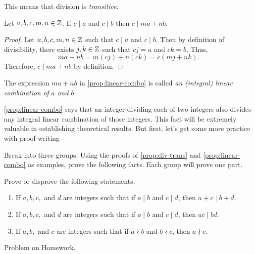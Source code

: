 \documentclass{ximera}
\begin{document}
This means that division is \emph{transitive}. 


\begin{proposition}\label{prop:linear-combo}
  Let $a,b,c,m,n\in\mathbb Z$.
  If $c\mid a$ and $c\mid b$ then $c\mid ma+nb$.

  \begin{proof}
    Let $a,b,c,m,n\in\mathbb Z$ such that $c\mid a$ and $c\mid b$. Then by definition of divisibility, there exists $j,k\in\mathbb Z$ such that $cj=a$ and $ck=b$. Thus, \[ma+nb=m(cj)+n(ck)=c(mj+nk).\] Therefore, $c\mid ma+nb$ by definition.
  \end{proof}
\end{proposition}

\begin{defn}
The expression $ma+nb$ in \cref{prop:linear-combo} is called \emph{an (integral) linear combination of $a$ and $b$.}
\end{defn}
\cref{prop:linear-combo} says that an integer dividing each of two integers also divides any integral linear combination of those integers. This fact will be extremely valuable in establishing theoretical results. But first, let's get some more practice with proof writing

Break into three groups. Using the proofs of \cref{prop:div-trans} and \cref{prop:linear-combo} as examples, prove the following facts. Each group will prove one part.

\begin{br}\label{divisfacts}
  Prove or disprove the following statements.
  \begin{enumerate}
    \item If $a,b,c,$ and $d$ are integers such that if $a\mid b$ and $c\mid d$, then $a+c\mid b+d$.
    \item If $a,b,c,$ and $d$ are integers such that if $a\mid b$ and $c\mid d$, then $ac\mid bd$.
    \item If $a,b,$ and $c$ are integers such that if $a\nmid b$ and $b\nmid c$, then $a\nmid c$.
  \end{enumerate}
  
  \begin{solution}
    Problem on Homework.
  \end{solution}
\end{br}
\end{document}
